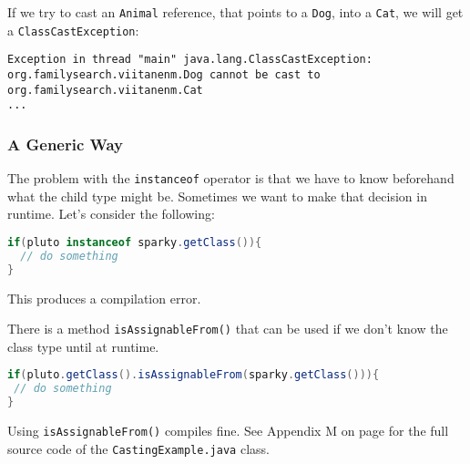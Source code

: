 If we try to cast an \texttt{Animal} reference, that points to a \texttt{Dog}, into a \texttt{Cat}, we will get a \texttt{ClassCastException}:
\begin{lstlisting}
Exception in thread "main" java.lang.ClassCastException: org.familysearch.viitanenm.Dog cannot be cast to org.familysearch.viitanenm.Cat
...
\end{lstlisting}

\subsubsection{A Generic Way}

The problem with the \texttt{instanceof} operator is that we have to know beforehand what the child type might be. Sometimes we want to make that decision in runtime. Let's consider the following:

\begin{lstlisting}[language=Java]
if(pluto instanceof sparky.getClass()){
  // do something
}
\end{lstlisting}

This produces a compilation error. 

There is a method \texttt{isAssignableFrom()} that can be used if we don't know the class type until at runtime.
\begin{lstlisting}[language=Java]
if(pluto.getClass().isAssignableFrom(sparky.getClass())){
 // do something
}
\end{lstlisting}

Using \texttt{isAssignableFrom()} compiles fine. See Appendix M on page \pageref{App:AppendixM} for the full source code of the \texttt{CastingExample.java} class.